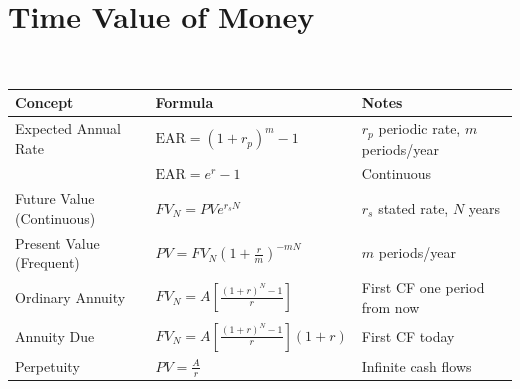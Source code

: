 \section{Time Value of Money}

\begin{definition} \\
\begin{tabular}{p{4.6cm}p{5.5cm}p{5cm}}
\hline
\textbf{Concept} & \textbf{Formula} & \textbf{Notes} \\
\hline
Expected Annual Rate & $\text{EAR} = (1 + r_p)^m - 1$ & $r_p$ periodic rate, $m$ periods/year \\
& $\text{EAR} = e^r - 1$ & Continuous \\
\hline
Future Value (Continuous) & $FV_N = PV e^{r_s N}$ & $r_s$ stated rate, $N$ years \\
\hline
Present Value (Frequent) & $PV = FV_N (1 + \frac{r}{m})^{-mN}$ & $m$ periods/year \\
\hline
Ordinary Annuity & $FV_N = A \left[ \frac{(1+r)^N - 1}{r} \right]$ & First CF one period from now \\
\hline
Annuity Due & $FV_N = A \left[ \frac{(1+r)^N - 1}{r} \right] (1+r)$ & First CF today \\
\hline
Perpetuity & $PV = \frac{A}{r}$ & Infinite cash flows \\
\hline
\end{tabular}
\end{definition}

